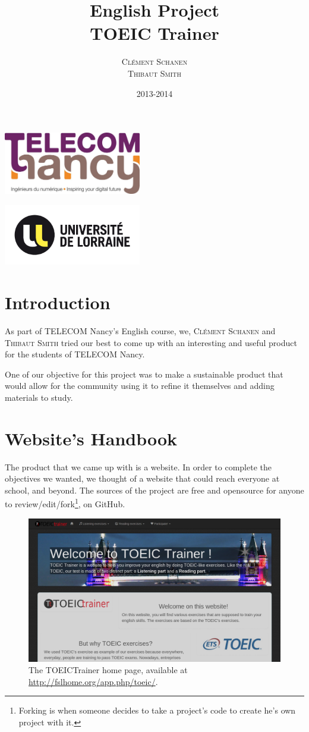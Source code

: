 \documentclass[12pt,a4paper]{report}
\title{English Project \\ \textbf{TOEIC Trainer}}
\author{\textsc{Clément Schanen} \\ \textsc{Thibaut Smith}}
\date{2013-2014}
\makeatletter
\def\maketitle{
\begin{minipage}{0.54\textwidth}
\begin{flushleft} \large
\LARGE \@author
\end{flushleft}
\end{minipage}
\begin{minipage}{0.4\textwidth}
\begin{flushright} \large
\end{flushright}
\end{minipage}
  \vfill
  \begin{center}\leavevmode
    \normalfont
    {\LARGE \@title\par}%
    {\Large \@date\par}
    \vskip 1cm
  \end{center}%
  \vfill
  \hfill
  
\begin{minipage}{0.54\textwidth}
\begin{flushleft} \large
\includegraphics[width=6cm]{telecomnancy.jpg}


\end{flushleft}
\end{minipage}
\begin{minipage}{0.4\textwidth}
\begin{flushright} \large
\includegraphics[width=6cm]{univ-lorraine.jpg}
\end{flushright}
\end{minipage}
  \cleardoublepage
  }
\makeatother
\begin{document}
\pagestyle{empty} %

\maketitle %

\pagestyle{plain}
\setcounter{page}{2}

\tableofcontents
\section*{Introduction}
As part of TELECOM Nancy's English course, we, \textsc{Clément Schanen} and
\textsc{Thibaut Smith} tried our best to come up with an interesting and
useful product for the students of TELECOM Nancy.

One of our objective for this project was to make a sustainable product that
would allow for the community using it to refine it themselves and adding
materials to study.

\pagebreak
\section{Website's Handbook}

The product that we came up with is a website\cite{TOEICTrainer}. In order to
complete the objectives we wanted, we thought of a website that could reach
everyone at school, and beyond. The sources of the project are free and
opensource for anyone to review/edit/fork\footnote{Forking is when someone
decides to take a project's code to create he's own project with it.}, on
GitHub\cite{github_tc}.

\begin{figure}[here]
\includegraphics[scale=0.35]{homepage.png}
\caption{The TOEICTrainer home page, available at \url{http://fslhome.org/app.php/toeic/}.}
\label{homepage}
\end{figure}
\end{document}
